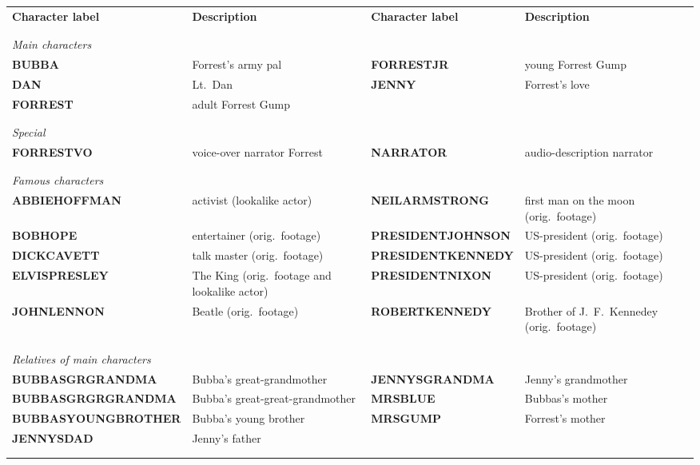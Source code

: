 \documentclass[10pt,a4paper,twocolumn]{article}
\begin{document}
\begin{table}
  \centering
  \begin{tabular}{p{4cm}p{4cm}p{3.6cm}p{4cm}}
    \textbf{Character label} & \textbf{Description} & \textbf{Character label} & \textbf{Description} \\
\\\hline\\

\multicolumn{4}{l}{\textit{Main characters}} \\
\textbf{BUBBA}     & Forrest's army pal & \textbf{FORRESTJR} & young Forrest Gump \\
\textbf{DAN}       & Lt.~Dan & \textbf{JENNY}     & Forrest's love \\
\textbf{FORREST}   & adult Forrest Gump &           & \\
\\\hline\\

\multicolumn{4}{l}{\textit{Special}} \\
\textbf{FORRESTVO} & voice-over narrator Forrest & \textbf{NARRATOR} & audio-description narrator \\
\\\hline\\

\multicolumn{4}{l}{\textit{Famous characters}} \\
\textbf{ ABBIEHOFFMAN}     & activist (lookalike actor)                   & \textbf{NEILARMSTRONG}    & first man on the moon (orig.~footage) \\ 
\textbf{ BOBHOPE}          & entertainer (orig.~footage)                  & \textbf{PRESIDENTJOHNSON} & US-president (orig.~footage) \\
\textbf{ DICKCAVETT}       & talk master (orig.~footage)                  & \textbf{PRESIDENTKENNEDY} & US-president (orig.~footage) \\
\textbf{ ELVISPRESLEY}     & The King (orig.~footage and lookalike actor) & \textbf{PRESIDENTNIXON}   & US-president (orig.~footage)  \\
\textbf{ JOHNLENNON}       & Beatle (orig.~footage)                       & \textbf{ROBERTKENNEDY}    & Brother of J.~F.~Kennedey (orig.~footage) \\                  & \\
\\\hline\\

\multicolumn{4}{l}{\textit{Relatives of main characters}} \\
\textbf{BUBBASGRGRANDMA}   & Bubba's great-grandmother & \textbf{JENNYSGRANDMA} & Jenny's grandmother\\
\textbf{BUBBASGRGRGRANDMA} & Bubba's great-great-grand\-mother & \textbf{MRSBLUE}       & Bubbas's mother\\
\textbf{BUBBASYOUNGBROTHER}      & Bubba's young brother & \textbf{MRSGUMP}       & Forrest's mother \\
\textbf{JENNYSDAD}               & Jenny's father &              & \\
\\\hline\\


\end{tabular}
\end{table}
\end{document}
